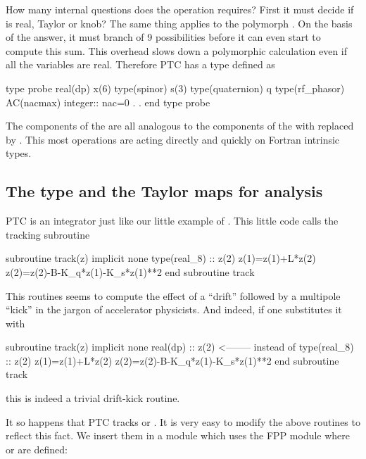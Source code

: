 \documentclass[english,12pt,article]{article} %
\begin{document}
{      How many internal questions does the \vn{+} operation requires?   First it must decide if  is real, Taylor or knob?  The same thing applies to the polymorph . On the basis of the answer, it must branch of 9 possibilities before it can even start to compute this sum.   This overhead slows down a polymorphic calculation even if all the variables are real.  Therefore PTC has a type  defined as
      
      \begin{example}
  type probe
     real(dp) x(6)
     type(spinor) s(3)
     type(quaternion) q
     type(rf_phasor)  AC(nacmax)
     integer:: nac=0
       .
       .
  end type probe
      \end{example}
      
      The components of the  are all analogous to the components of the  with  replaced by . This most operations are acting directly and quickly on Fortran intrinsic types.
      
 \subsection{The type {}  and the Taylor maps  {}   for analysis}\label{sec:raymap}
 
   PTC is an integrator  just like our little example of . This little code  calls the tracking subroutine 
   \begin{code}
      subroutine track(z)
      implicit none
      type(real_8) :: z(2) 
       z(1)=z(1)+L*z(2) 
       z(2)=z(2)-B-K_q*z(1)-K_s*z(1)**2 
      end subroutine track
    \end{code}

This routines seems to compute the effect of a ``drift'' followed by a multipole ``kick'' in the jargon of accelerator physicists.  And indeed, if one substitutes it with 
   \begin{code}
      subroutine track(z)
      implicit none
      real(dp) :: z(2)            <-------- instead of type(real_8) :: z(2) 
       z(1)=z(1)+L*z(2) 
       z(2)=z(2)-B-K_q*z(1)-K_s*z(1)**2 
      end subroutine track
    \end{code}
   this is indeed a trivial  drift-kick routine.   
    
It so happens that PTC tracks  or  .  It is very easy to modify the above routines to reflect this fact. We insert them in a module which  uses the FPP
module   where   or   are defined:

}
\end{document}
